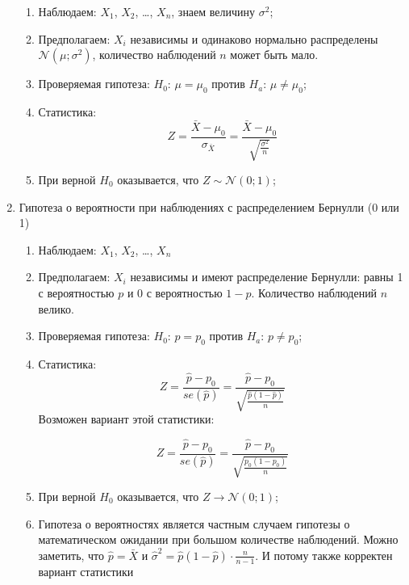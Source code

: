 \documentclass[12pt, a4paper]{article}
\def \cN{\mathcal{N}}
\begin{document}
\begin{enumerate}
\begin{enumerate}
      \item Наблюдаем: $X_1$, $X_2$, \ldots, $X_n$, знаем величину $\sigma^2$;

      \item Предполагаем: $X_i$ независимы и одинаково нормально распределены $\cN(\mu; \sigma^2)$, количество наблюдений $n$ может быть мало.

      \item Проверяемая гипотеза: $H_0$: $\mu = \mu_0$ против $H_a$: $\mu \neq \mu_0$;

      \item Статистика:
	\[
	  Z = \frac{\bar X - \mu_0}{\sigma_{\bar X}} = \frac{\bar X - \mu_0}{\sqrt{\frac{\sigma^2}{n}}}
	\]

      \item При верной $H_0$ оказывается, что $Z \sim \cN(0;1)$;


    \end{enumerate}



  \item Гипотеза о вероятности при наблюдениях с распределением Бернулли (0 или 1)
  \begin{enumerate}

      \item Наблюдаем: $X_1$, $X_2$, \ldots, $X_n$

      \item Предполагаем: $X_i$ независимы и имеют распределение Бернулли: равны 1 с вероятностью $p$ и 0 с вероятностью $1-p$. Количество наблюдений $n$ велико.

      \item Проверяемая гипотеза: $H_0$: $p = p_0$ против $H_a$: $p \neq p_0$;

      \item Статистика:
	\[
	  Z = \frac{\hat p - p_0}{se(\hat p)} = \frac{\hat p - p_0}{\sqrt{\frac{\hat p (1- \hat p)}{n}}}
      \]
      Возможен вариант этой статистики:

	\[
	  Z = \frac{\hat p - p_0}{se(\hat p)} = \frac{\hat p - p_0}{\sqrt{\frac{p_0 (1- p_0 )}{n}}}
      \]


     \item При верной $H_0$ оказывается, что $Z \to \cN(0;1)$;

     \item Гипотеза о вероятностях является частным случаем гипотезы о математическом ожидании при большом количестве наблюдений. Можно заметить, что $\hat p = \bar X$ и $\hat \sigma^2 = \hat p (1- \hat p) \cdot \frac{n}{n-1}$. И потому также корректен вариант статистики


\end{enumerate}
\end{enumerate}
\end{document}
